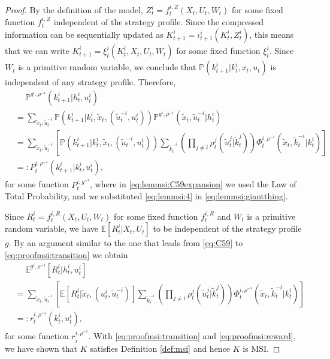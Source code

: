 \documentclass[pdflatex,sn-basic]{sn-jnl}
\newcommand{\E}{\mathbb{E}}
\renewcommand{\Pr}{\mathbb{P}}
\newcommand{\Comp}{K}
\newcommand{\comp}{k}
\theoremstyle{thmstyleone}%
\theoremstyle{thmstyletwo}%
\theoremstyle{thmstylethree}%
\begin{document}
\begin{appendices}
\begin{proof}
	By the definition of the model, $Z_t^i = f_t^{i,Z}(X_t, U_t, W_t)$ for some fixed function $f_t^{i,Z}$ independent of the strategy profile. 
    Since the compressed information can be sequentially updated as $\Comp_{t+1}^i=\iota_{t+1}^i(\Comp_t^i, Z_t^i)$, this means that we can write $\Comp_{t+1}^i = \xi_t^i(\Comp_t^i, X_t, U_t, W_t)$ for some fixed function $\xi_t^i$. Since $W_t$ is a primitive random variable, we conclude that $\Pr(\comp_{t+1}^i| \comp_t^i, x_t, u_t)$ is independent of any strategy profile. Therefore,
	\begin{align}
		&\quad~\Pr^{g^i, \rho^{-i}}(\comp_{t+1}^i|h_t^i, u_t^i)\label{eq:C59} \\
		&= \sum_{\tilde{x}_t, \tilde{u}_t^{-i}} \Pr(\comp_{t+1}^i|\comp_t^i, \tilde{x}_t, (\tilde{u}_t^{-i}, u_t^i) )  \Pr^{g^i, \rho^{-i}}(\tilde{x}_t, \tilde{u}_t^{-i}|h_t^i)\label{eq:lemmsi:C59expansion} \\
		&=\sum_{\tilde{x}_t, \tilde{u}_t^{-i}} \left[ \Pr(\comp_{t+1}^i|\comp_t^i, \tilde{x}_t, (\tilde{u}_t^{-i}, u_t^i) ) \sum_{\tilde{\comp}_t^{-i}}\left( \prod_{j\neq i} \rho_t^{j}(\tilde{u}_t^j|\tilde{\comp}_t^j) \right)\Phi_t^{i, \rho^{-i}}(\tilde{x}_t, \tilde{\comp}_t^{-i}|\comp_t^i) \right] \label{eq:lemmsi:giantthing} \\
		&=:P_t^{i, \rho^{-i}}(\comp_{t+1}^i|\comp_t^i, u_t^i),\label{eq:proofmsi:transition}
	\end{align}
	for some function $P_t^{i, g^{-i}}$, {where in \eqref{eq:lemmsi:C59expansion} we used the Law of Total Probability, and we substituted \eqref{eq:lemmsi:4} in \eqref{eq:lemmsi:giantthing}. }
	
	Since $R_t^i = f_t^{i,R}(X_t, U_t, W_t)$ for some fixed function $f_t^{i,R}$ and $W_t$ is a primitive random variable, we have $\E[R_t^i|X_t, U_t]$ to be independent of the strategy profile $g$. By an argument similar to the one that leads from \eqref{eq:C59} to \eqref{eq:proofmsi:transition} we obtain
	\begin{align}
		&\quad~\E^{g^i, \rho^{-i}}[R_t^i|h_t^i, u_t^i] \\
        &= \sum_{\tilde{x}_t, \tilde{u}_t^{-i}} \left[ \E[R_t^i|\tilde{x}_t, (u_t^i, \tilde{u}_t^{-i})] \sum_{\tilde{\comp}_t^{-i}}\left( \prod_{j\neq i} \rho_t^{j}(\tilde{u}_t^j|\tilde{\comp}_t^j) \right)\Phi_t^{i, \rho^{-i}}(\tilde{x}_t, \tilde{\comp}_t^{-i}|\comp_t^i) \right]  \\
		&=: r_t^{i, \rho^{-i}}(\comp_t^i, u_t^i),\label{eq:proofmsi:reward}
	\end{align}
	for some function $r_i^{i, \rho^{-i}}$. With \eqref{eq:proofmsi:transition} and \eqref{eq:proofmsi:reward}, we have shown that $\Comp$ satisfies Definition \ref{def:msi} and hence $\Comp$ is MSI.


\end{proof}
\end{appendices}
\end{document}
